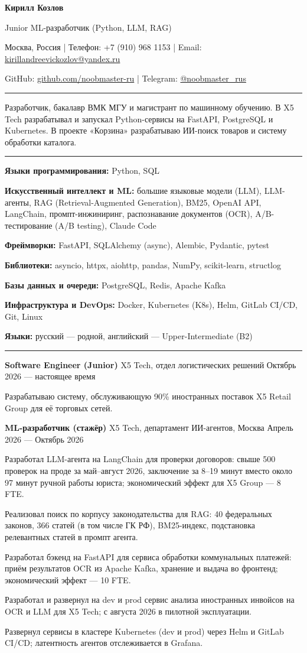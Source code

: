 \documentclass[10pt,a4paper]{article}
\newcommand{\cvsection}[1]{%
  \vspace{5pt}{\large\bfseries #1}\par\vspace{2pt}\hrule\vspace{4pt}}
\newcommand{\cventry}[3]{%
  \textbf{#1} \textbar{} #3 \textbar{} #2\par\vspace{1pt}}
\newcommand{\skilllangs}{\textbf{Языки программирования:} Python, SQL\par}
\newcommand{\skillai}{\textbf{Искусственный интеллект и ML:} большие языковые модели (LLM), LLM-агенты,
RAG (Retrieval-Augmented Generation), BM25, OpenAI API, LangChain, промпт-инжиниринг,
распознавание документов (OCR), A/B-тестирование (A/B testing), Claude Code\par}
\newcommand{\skillframeworks}{\textbf{Фреймворки:} FastAPI, SQLAlchemy (async), Alembic, Pydantic, pytest\par}
\newcommand{\skilllibs}{\textbf{Библиотеки:} asyncio, httpx, aiohttp, pandas, NumPy, scikit-learn, structlog\par}
\newcommand{\skilldb}{\textbf{Базы данных и очереди:} PostgreSQL, Redis, Apache Kafka\par}
\newcommand{\skillinfra}{\textbf{Инфраструктура и DevOps:} Docker, Kubernetes (K8s), Helm, GitLab CI/CD, Git, Linux\par}
\newcommand{\skillhuman}{\textbf{Языки:} русский --- родной, английский --- Upper-Intermediate (B2)}
\begin{document}
{\LARGE\bfseries Кирилл Козлов}\par\vspace{3pt}
Junior ML-разработчик (Python, LLM, RAG)\par\vspace{3pt}
Москва, Россия | Телефон: +7 (910) 968 1153 | Email: \href{mailto:kirillandreevickozlov@yandex.ru}{kirillandreevickozlov@yandex.ru}\par
GitHub: \href{https://github.com/noobmaster-ru}{github.com/noobmaster-ru} | Telegram: \href{https://t.me/noobmaster_rus}{@noobmaster\_rus}

\cvsection{О себе}
Разработчик, бакалавр ВМК МГУ и магистрант по машинному обучению. В X5 Tech разрабатывал и запускал Python-сервисы на FastAPI, PostgreSQL и Kubernetes. В проекте «Корзина» разрабатываю ИИ-поиск товаров и систему обработки каталога.

\cvsection{Ключевые навыки}
\skilllangs
\skillai\skillframeworks\skilllibs\skilldb\skillinfra
\skillhuman

\cvsection{Опыт работы}
\cventry{Software Engineer (Junior)}{Октябрь 2026 --- настоящее время}{X5 Tech, отдел логистических решений}
\begin{cvitems}
    \item Разрабатываю систему, обслуживающую 90\% иностранных поставок X5 Retail Group для её торговых сетей.
\end{cvitems}
\vspace{2pt}

\cventry{ML-разработчик (стажёр)}{Апрель 2026 --- Октябрь 2026}{X5 Tech, департамент ИИ-агентов, Москва}
\begin{cvitems}
%
    \item Разработал LLM-агента на LangChain для проверки договоров: свыше 500 проверок на проде за май--август 2026, заключение за 8--19 минут вместо около 97 минут ручной работы юриста; экономический эффект для X5 Group --- 8 FTE.
    \item Реализовал поиск по корпусу законодательства для RAG: 40 федеральных законов, 366 статей (в том числе ГК РФ), BM25-индекс, подстановка релевантных статей в промпт агента.
    \item Разработал бэкенд на FastAPI для сервиса обработки коммунальных платежей: приём результатов OCR из Apache Kafka, хранение и выдача во фронтенд; экономический эффект --- 10 FTE.
    \item Разработал и развернул на dev и prod сервис анализа иностранных инвойсов на OCR и LLM для X5 Tech; с августа 2026 в пилотной эксплуатации.
    \item Развернул сервисы в кластере Kubernetes (dev и prod) через Helm и GitLab CI/CD; латентность агентов отслеживается в Grafana.%

\end{cvitems}
\end{document}
